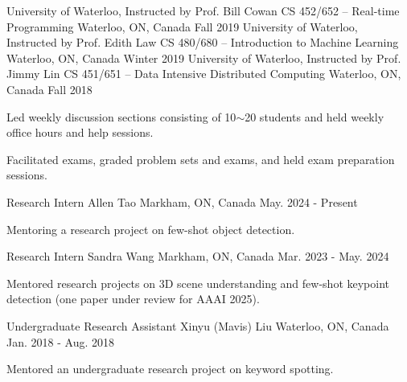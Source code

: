 


\begin{cventries}
\cventrynodesc
{University of Waterloo, Instructed by Prof. Bill Cowan} %
{CS 452/652 -- Real-time Programming} %
{Waterloo, ON, Canada} %
{Fall 2019} %
\cventrynodesc
{University of Waterloo, Instructed by Prof. Edith Law} %
{CS 480/680 -- Introduction to Machine Learning} %
{Waterloo, ON, Canada} %
{Winter 2019} %
\cventry
{University of Waterloo, Instructed by Prof. Jimmy Lin} %
{CS 451/651 -- Data Intensive Distributed Computing} %
{Waterloo, ON, Canada} %
{Fall 2018} %
{ %
\begin{cvitems}
\item {Led weekly discussion sections consisting of 10$\sim$20 students and held weekly office hours and help sessions.}
\item {Facilitated exams, graded problem sets and exams, and held exam preparation sessions.}
\end{cvitems}
}
\end{cventries}
\newpage
{}
\begin{cventries}
\cventry
{Research Intern} %
{Allen Tao} %
{Markham, ON, Canada} %
{May. 2024 - Present} %
{ %
\begin{cvitems}
\item {Mentoring a research project on few-shot object detection.}
\end{cvitems}
}
\cventry
{Research Intern} %
{Sandra Wang} %
{Markham, ON, Canada} %
{Mar. 2023 - May. 2024} %
{ %
\begin{cvitems}
\item {Mentored research projects on 3D scene understanding and few-shot keypoint detection (one paper under review for AAAI 2025).}
\end{cvitems}
}
\cventry
{Undergraduate Research Assistant} %
{Xinyu (Mavis) Liu} %
{Waterloo, ON, Canada} %
{Jan. 2018 - Aug. 2018} %
{ %
\begin{cvitems}
\item {Mentored an undergraduate research project on keyword spotting.}
\end{cvitems}
}
\end{cventries}
